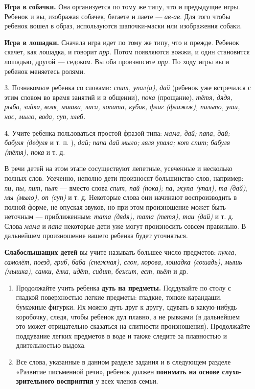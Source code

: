 \documentclass{book}
\renewcommand{\emph}[1]{\textit{#1}}
\begin{document}
\textbf{Игра в собачки.} Она организуется по тому же типу, что и
предыдущие игры. Ребенок и вы, изображая собачек, бегаете и лаете ---
\emph{ав-ав.} Для того чтобы ребенок вошел в образ, используются
шапочки-маски или изображения собаки.

\textbf{Игра в лошадки.} Сначала игра идет по тому же типу, что и
прежде. Ребенок скачет, как лошадка, и говорит \emph{прр.} Потом
появляются вожжи, и один становится лошадью, другой --- седоком. Вы оба
произносите \emph{прр.} По ходу игры вы и ребенок меняетесь ролями.

3. Познакомьте ребенка со словами: \emph{спит, упал(а), дай} (ребенок
уже встречался с этим словом во время занятий и в общении), \emph{пока}
(прощание), \emph{тётя, дядя, рыба, зайка, волк, мишка, лиса, лопата,
кубик, флаг (флажок), пальто, уши, нос, мыло, вода, суп, хлеб.}

4. Учите ребенка пользоваться простой фразой типа: \emph{мама, дай;
папа, дай; бабуля (дедуля} и т. п. ), \emph{дай; папа дай мыло; ляля
упала; кот спит; бабуля (тётя), пока} и т. д.

В речи детей на этом этапе сосуществуют лепетные, усеченные и несколько
полных слов. Усеченно, неполно дети произносят большинство слов,
например: \emph{пи, пы, пит, пыт} --- вместо слова \emph{спит, пай
(пока); па, жупа (упал), та (дай), мы (мыло), оп (суп)} и т. д.
Некоторые слова они начинают воспроизводить в полной форме, не опуская
звуков, но при этом произношение может быть неточным --- приближенным:
\emph{тата (дядя), тата (тетя), таи (дай)} и т. д. Слова \emph{мама} и
\emph{папа} некоторые дети уже могут произносить совсем правильно. В
дальнейшем произношение вашего ребенка будет уточняться.

\textbf{Слабослышащих детей} вы учите называть большее число предметов:
\emph{кукла, самолёт, поезд, гриб, баба (снежная), слон, корова, лошадка
(лошадь), мышь (мышка), санки, ёлка, идёт, сидит, бежит, ест, пьёт} и
др.


\begin{enumerate}
\def\labelenumi{\arabic{enumi}.}
\setcounter{enumi}{3}
\item
  
  Продолжайте учить ребенка \textbf{дуть на предметы.} Поддувайте по
  столу с гладкой поверхностью легкие предметы: гладкие, тонкие
  карандаши, бумажные фигурки. Их можно дуть друг к другу, сдувать в
  какую-нибудь коробочку, следя, чтобы ребенок дул плавно, а не рывками
  (в дальнейшем это может отрицательно сказаться на слитности
  произношения). Продолжайте поддувание легких предметов в воде и также
  следите за плавностью и длительностью выдоха.
  
\item
  
  Все слова, указанные в данном разделе задания и в следующем разделе
  «Развитие письменной речи», ребенок должен \textbf{понимать на основе
  слухо-зрительного восприятия} у всех членов семьи.
  
\end{enumerate}
\end{document}
